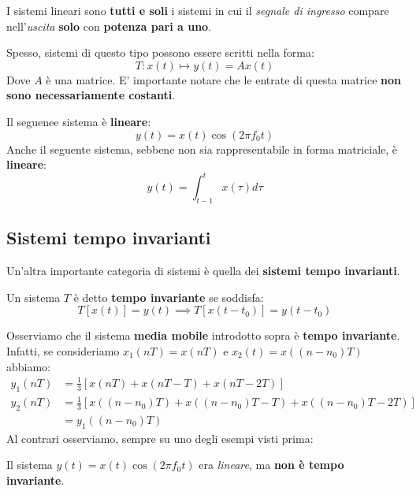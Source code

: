 \begin{prop}
    I sistemi lineari sono \textbf{tutti e soli} i sistemi in
    cui il \textit{segnale di ingresso} compare nell'\textit{uscita}
    \textbf{solo} con \textbf{potenza pari a uno}.
\end{prop}

Spesso, sistemi di questo tipo possono essere scritti nella forma:
\[
    T: x(t) \mapsto y(t) = Ax(t)
\]
Dove $A$ è una matrice.
E' importante notare che le entrate di questa matrice
\textbf{non sono necessariamente costanti}.

\begin{exa}
    Il seguenee sistema è \textbf{lineare}:
    \[
        y(t) = x(t)\cos (2\pi f_{0}t)
    \] 
    Anche il seguente sistema, sebbene non sia rappresentabile in 
    forma matriciale, è \textbf{lineare}:
    \[
        y(t) = \int_{t-1}^{t} x(\tau )d \tau
    \]
\end{exa}

\subsection{Sistemi tempo invarianti}

Un'altra importante categoria di sistemi è quella dei \textbf{sistemi tempo invarianti}.

\begin{definition}
    Un sistema $T$ è detto \textbf{tempo invariante} se soddisfa:
    \[
        T[x(t)] = y(t) \implies T[x(t-t_{0})] = y(t-t_{0})
    \] 
\end{definition}

Osserviamo che il sistema \textbf{media mobile} introdotto sopra è
\textbf{tempo invariante}. Infatti, se consideriamo $x_{1}(nT)=x(nT)$ e $x_{2}(t)=x((n-n_{0})T)$ abbiamo:
\[
    \begin{aligned}
        y_{1}(nT) &= \frac{1}{3}\left[ x(nT) + x(nT-T) + x(nT-2T) \right] \\ 
        y_{2}(nT) &= \frac{1}{3}\left[ x((n-n_{0})T) + x((n-n_{0})T - T) + x((n-n_{0})T - 2T) \right] \\ 
                 &= y_{1}((n-n_{0})T)
    \end{aligned}
\]
Al contrari osserviamo, sempre su uno degli esempi visti prima:

\begin{remark}
    Il sistema $y(t)=x(t)\cos (2\pi f_{0}t)$ era \textit{lineare}, ma
    \textbf{non è tempo invariante}.
\end{remark}

